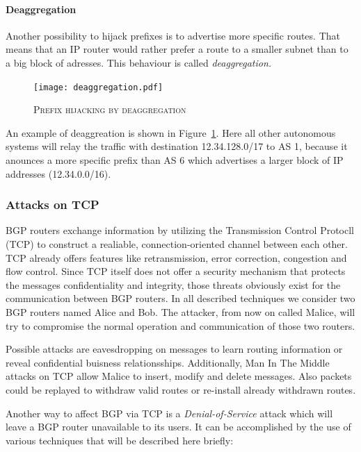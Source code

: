 \documentclass[12pt,a4paper]{IEEEtran}
\begin{document}
		\paragraph{Deaggregation}
		Another possibility to hijack prefixes is to advertise more specific routes. That means that an IP router would rather prefer a route to a smaller subnet than to a big block of adresses. This behaviour is called \emph{deaggregation.} 
		
		\begin{figure}[ht!]
			\begin{center}
				\texttt{[image: deaggregation.pdf]}
				\caption{\textsc{Prefix hijacking by deaggregation}}
			\end{center}
			\label{deaggregation}
		\end{figure}
		An example of deaggreation is shown in \mbox{Figure \ref{deaggregation}}. Here all other autonomous systems will relay the traffic with destination 12.34.128.0/17 to AS 1, because it anounces a more specific prefix than AS 6 which advertises a larger block of IP addresses (12.34.0.0/16).
		
	       	\subsubsection{Attacks on TCP}
		BGP routers exchange information by utilizing the Transmission Control Protocll (TCP) to construct a realiable, connection-oriented channel between each other. 
		TCP already offers features like retransmission, error correction, congestion and flow control. 
		Since TCP itself does not offer a security mechanism that protects the messages confidentiality and integrity, those threats obviously exist for the communication between BGP routers. 
		In all described techniques we consider two BGP routers named Alice and Bob. The attacker, from now on called Malice, will try to compromise the normal operation and communication of those two routers.

		Possible attacks are eavesdropping on messages to learn routing information or reveal confidential buisness relationsships.
		Additionally, Man In The Middle attacks on TCP allow Malice to insert, modify and delete messages. 
		Also packets could be replayed to withdraw valid routes or re-install already withdrawn routes.
	
		Another way to affect BGP via TCP is a \emph{Denial-of-Service} attack which will leave a BGP router unavailable to its users.
		It can be accomplished by the use of various techniques that will be described here briefly:
\end{document}
